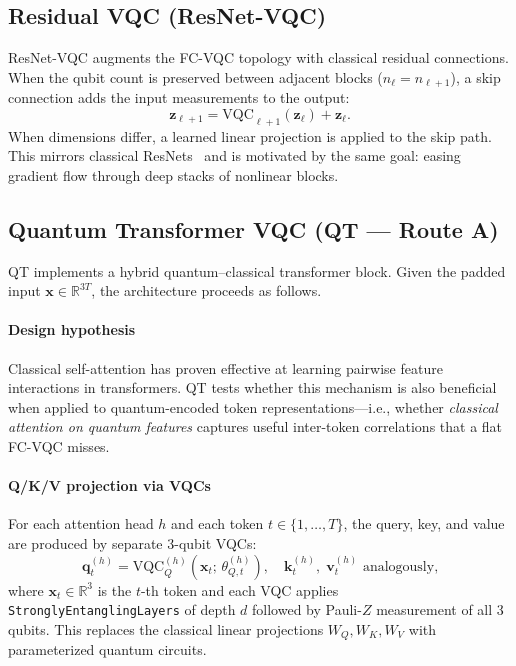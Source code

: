 \documentclass[10pt,conference]{IEEEtran}
\begin{document}
\subsection{Residual VQC (ResNet-VQC)}

ResNet-VQC augments the FC-VQC topology with classical residual connections.
When the qubit count is preserved between adjacent blocks ($n_\ell = n_{\ell+1}$), a skip connection adds the input measurements to the output:
\begin{equation}
    \mathbf{z}_{\ell+1} = \mathrm{VQC}_{\ell+1}(\mathbf{z}_\ell) + \mathbf{z}_\ell.
\end{equation}
When dimensions differ, a learned linear projection is applied to the skip path.
This mirrors classical ResNets~\cite{he2016deep} and is motivated by the same goal: easing gradient flow through deep stacks of nonlinear blocks.

\subsection{Quantum Transformer VQC (QT --- Route A)}
\label{sec:qt}

QT implements a hybrid quantum--classical transformer block.
Given the padded input $\mathbf{x} \in \mathbb{R}^{3T}$, the architecture proceeds as follows.

\paragraph{Design hypothesis}
Classical self-attention has proven effective at learning pairwise feature interactions in transformers.
QT tests whether this mechanism is also beneficial when applied to quantum-encoded token representations---i.e., whether \emph{classical attention on quantum features} captures useful inter-token correlations that a flat FC-VQC misses.

\paragraph{Q/K/V projection via VQCs}
For each attention head $h$ and each token $t \in \{1,\dots,T\}$, the query, key, and value are produced by separate 3-qubit VQCs:
\begin{equation}
    \mathbf{q}_t^{(h)} = \mathrm{VQC}_{Q}^{(h)}(\mathbf{x}_t;\, \theta_{Q,t}^{(h)}), \quad
    \mathbf{k}_t^{(h)},\; \mathbf{v}_t^{(h)} \text{ analogously,}
\end{equation}
where $\mathbf{x}_t \in \mathbb{R}^3$ is the $t$-th token and each VQC applies \texttt{StronglyEntanglingLayers} of depth $d$ followed by Pauli-$Z$ measurement of all 3 qubits.
This replaces the classical linear projections $W_Q, W_K, W_V$ with parameterized quantum circuits.
\end{document}
